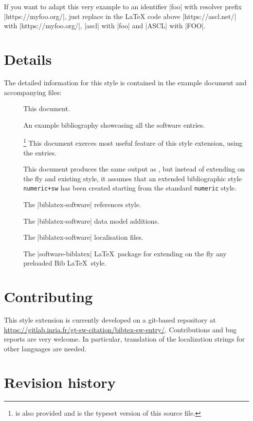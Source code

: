 \documentclass{ltxdockit}
\begin{document}
If you want to adapt this very example to an identifier |foo| with resolver prefix |https://myfoo.org/|, just replace in the \LaTeX{} code above |https://ascl.net/| with |https://myfoo.org/|, |ascl| with |foo| and |ASCL| with |FOO|.

\section{Details}

The detailed information for this style is contained in the example document and
accompanying  files:
\begin{description}
\item[] This document.
\item[] An example bibliography showcasing all the software entries.
\item[]\footnote{ is also
  provided and is the typeset version of this \latex source file.} This document
  exerces most useful feature of this style extension, using the
   entries.
\item[] This document produces the same output as
  , but instead of extending on the fly and existing
  style, it assumes that an extended bibliographic style \texttt{numeric+sw} has
  been created starting from the standard \texttt{numeric} style.
\item[] The |biblatex-software| references style.
\item[] The |biblatex-software| data model additions.
\item[] The |biblatex-software| localisation files.
\item[] The |software-biblatex| \LaTeX\ package for extending on the fly any preloaded Bib \LaTeX\ style.
\end{description}

\section{Contributing}

This style extension is currently developed on a git-based repository at
\url{https://gitlab.inria.fr/gt-sw-citation/bibtex-sw-entry/}.
Contributions and bug reports are very welcome. In particular, translation
of the localization strings for other languages are needed.

\section{Revision history}\label{rev}

\begin{changelog}



\end{changelog}



\end{document}
